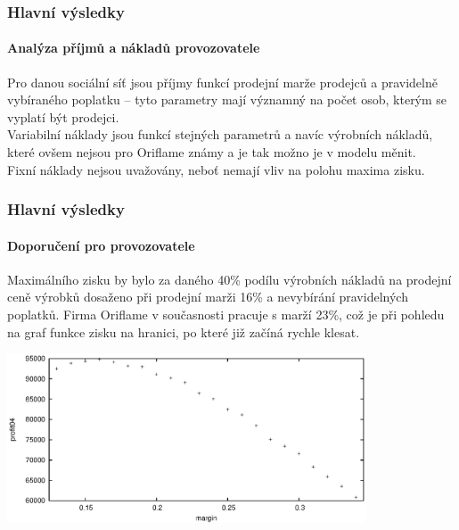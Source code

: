 \documentclass[xcolor=dvipsnames]{beamer}
\begin{document}
  \begin{frame}
    \frametitle{Hlavní výsledky}
    \framesubtitle{Analýza příjmů a nákladů provozovatele}
    Pro danou sociální síť jsou příjmy funkcí prodejní marže prodejců a pravidelně vybíraného poplatku -- tyto parametry mají významný na počet osob, kterým se vyplatí být prodejci.\\
    Variabilní náklady jsou funkcí stejných parametrů a navíc výrobních nákladů, které ovšem nejsou pro Oriflame známy a je tak možno je v modelu měnit.\\
    Fixní náklady nejsou uvažovány, neboť nemají vliv na polohu maxima zisku.\\
  \end{frame}
  \begin{frame}
    \frametitle{Hlavní výsledky}
    \framesubtitle{Doporučení pro provozovatele}
    Maximálního zisku by bylo za daného 40\% podílu výrobních nákladů na prodejní ceně výrobků dosaženo při prodejní marži 16\% a nevybírání pravidelných poplatků. Firma Oriflame v současnosti pracuje s marží 23\%, což je při pohledu na graf funkce zisku na hranici, po které již začíná rychle klesat.\\
    \begin{center}\includegraphics[width=0.8\textwidth]{max-profit-04-f0.eps}\end{center}
  \end{frame}      
\end{document}
